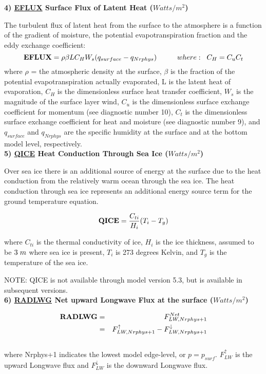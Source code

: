 {\bf 4)  \underline {EFLUX} Surface Flux of Latent Heat ($Watts/m^2$) } 

The turbulent flux of latent heat from the surface to the atmosphere is a function of the
gradient of moisture, the potential evapotranspiration fraction and the eddy exchange coefficient:
\[
{\bf EFLUX} =  \rho \beta L C_{H} W_s (q_{surface} - q_{Nrphys})
\hspace{1cm}where: \hspace{.2cm}C_H = C_u C_t
\]
where $\rho$ = the atmospheric density at the surface, $\beta$ is the fraction of
the potential evapotranspiration actually evaporated, L is the latent
heat of evaporation, $C_{H}$ is the dimensionless surface heat transfer coefficient, $W_s$ is the 
magnitude of the surface layer wind, $C_u$ is the dimensionless surface exchange coefficient 
for momentum (see diagnostic number 10), $C_t$ is the dimensionless surface exchange coefficient 
for heat and moisture (see diagnostic number 9), and $q_{surface}$ and $q_{Nrphys}$ are the specific
humidity at the surface and at the bottom model level, respectively.
\\

{\bf 5)  \underline {QICE} Heat Conduction Through Sea Ice ($Watts/m^2$) } 

Over sea ice there is an additional source of energy at the surface due to the heat
conduction from the relatively warm ocean through the sea ice. The heat conduction
through sea ice represents an additional energy source term for the ground temperature equation.

\[
{\bf QICE} = {C_{ti} \over {H_i}} (T_i-T_g)
\]

where $C_{ti}$ is the thermal conductivity of ice, $H_i$ is the ice thickness, assumed to
be $3 \hspace{.1cm} m$ where sea ice is present, $T_i$ is 273 degrees Kelvin, and
$T_g$ is the temperature of the sea ice.

NOTE: QICE is not available through model version 5.3, but is available in subsequent versions.
\\
 

{\bf 6) \underline {RADLWG} Net upward Longwave Flux at the surface ($Watts/m^2$)}

\begin{eqnarray*}
{\bf RADLWG} & =  & F_{LW,Nrphys+1}^{Net} \\
             & =  & F_{LW,Nrphys+1}^\uparrow - F_{LW,Nrphys+1}^\downarrow
\end{eqnarray*}
\\
where Nrphys+1 indicates the lowest model edge-level, or $p = p_{surf}$.
$F_{LW}^\uparrow$ is
the upward Longwave flux and $F_{LW}^\downarrow$ is the downward Longwave flux.
\\

